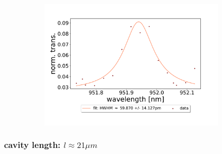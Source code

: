 \begin{figure}[h!]
\begin{subfigure}[b]{0.49\textwidth}
        \includegraphics[width=\textwidth]{figures/results/double fano fits/20250326/33um_M3:M5_fit_15.pdf}
        \caption{}
        \label{fig:33um_M3:M5_fit_15}
    \end{subfigure}
\end{figure}

\clearpage
\subsubsection*{cavity length: $l \approx 21 \mu m$}

